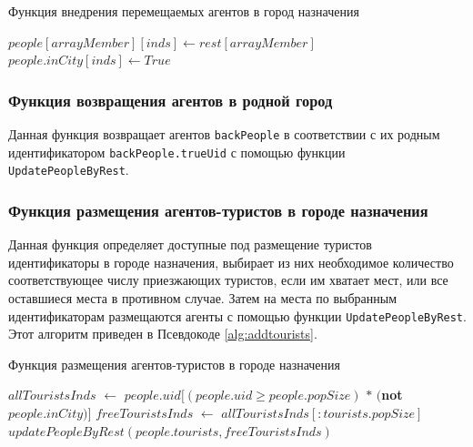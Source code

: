 \documentclass[a4paper,12pt]{article} %
\begin{document}
\begin{algorithm}[h]
\caption{Функция внедрения перемещаемых агентов в город назначения}
\label{alg:updatepeoplebyrest}
\begin{algorithmic}[1]
			\State \(people[arrayMember][inds] \gets rest[arrayMember]\)
		\EndIf
	\EndFor
	\State \(people.inCity[inds] \gets True\)
\EndFunction
\end{algorithmic}
\end{algorithm}

\subsubsection{Функция возвращения агентов в родной город}

Данная функция возвращает агентов \texttt{backPeople} в соответствии с их родным идентификатором \texttt{backPeople.trueUid} с помощью функции \texttt{UpdatePeopleByRest}. 


\subsubsection{Функция размещения агентов-туристов в городе назначения}

Данная функция определяет доступные под размещение туристов идентификаторы в городе назначения, выбирает из них необходимое количество соответствующее числу приезжающих туристов, если им хватает мест, или все оставшиеся места в противном случае. Затем на места по выбранным идентификаторам размещаются агенты с помощью функции \texttt{UpdatePeopleByRest}. Этот алгоритм приведен в Псевдокоде \ref{alg:addtourists}.

\begin{algorithm}[h]
\caption{Функция размещения агентов-туристов в городе назначения}
\label{alg:addtourists}
\begin{algorithmic}[1]
	\State \(allTouristsInds\) \(\gets\) \(people.uid[(people.uid \geqslant people.popSize)\) \(*\) \((\)\textbf{not} \(people.inCity)]\)
	\State \(freeTouristsInds\) \(\gets\) \(allTouristsInds[:tourists.popSize]\)
	\State \(updatePeopleByRest(people.tourists,freeTouristsInds)\)
\EndFunction
\end{algorithmic}
\end{algorithm}
\end{document}
